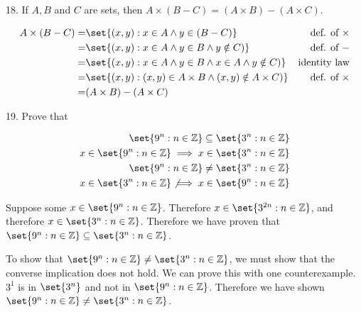 \documentclass{hippoidC}
\begin{document}
\begin{prooflist}{18. If $A, B$ and $C$ are sets, then $A \times(B-C)=(A \times B)-(A \times C)$.}
	\item
	\begin{align*}
		A\times (B-C) = & \set{(x, y): x\in A \land y\in (B-C)}                             & \text{def. of }\times \\
		=               & \set{(x,y): x\in A \land y \in B \land y\notin C)}                & \text{def. of }-      \\
		=               & \set{(x,y): x\in A \land y \in B \land x\in A \land y\notin C)}   & \text{identity law}   \\
		=               & \set{(x,y): (x, y) \in A\times B \land (x, y) \notin A \times C)} &
		\text{def. of }\times                                                                                       \\
		=               & (A\times B) - (A\times C)
	\end{align*}
\end{prooflist}

\begin{prooflist}{19. Prove that}
	\item
	\begin{align*}
		\set{9^n: n \in \mathbb{Z}} \subseteq\set{3^n: n \in \mathbb{Z}}          \\
		x\in \set{9^n: n \in \mathbb{Z}} \implies x\in\set{3^n: n \in \mathbb{Z}} \\
		\set{9^n: n \in \mathbb{Z}} \neq\set{3^n: n \in \mathbb{Z}}               \\
		x\in\set{3^n: n \in \mathbb{Z}}
		\not\implies
		x\in \set{9^n: n \in \mathbb{Z}}
	\end{align*}
	\item Suppose some $x\in \set{9^n: n\in\mathbb{Z}}$. Therefore $x\in\set{3^{2n}:
			n\in\mathbb{Z}}$, and therefore $x\in\set{3^n: n\in\mathbb{Z}}$. Therefore
	we have proven that $\set{9^n: n \in \mathbb{Z}} \subseteq\set{3^n: n \in \mathbb{Z}}$.
	\item To show that $\set{9^n: n \in \mathbb{Z}} \neq\set{3^n: n \in
			\mathbb{Z}}$, we must show that the converse implication does not hold. We
	can prove this with one counterexample. $3^1$ is in $\set{3^n}$ and not in
	$\set{9^n:n\in\mathbb{Z}}$. Therefore we have shown
	$\set{9^n: n \in \mathbb{Z}} \neq\set{3^n: n \in \mathbb{Z}}$.
\end{prooflist}
\end{document}
